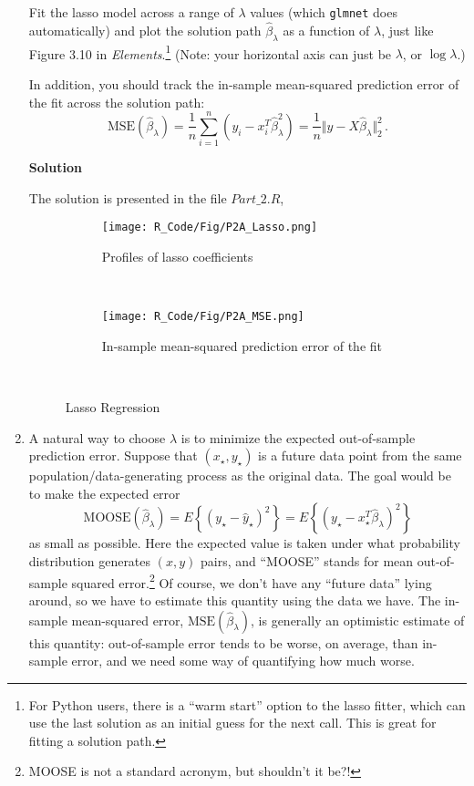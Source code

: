 \documentclass[11 pt]{article}
\begin{document}
\begin{enumerate}[label=(\Alph*)]
Fit the lasso model across a range of $\lambda$ values (which \verb|glmnet| does automatically) and plot the solution path $\hat{\beta}_{\lambda}$ as a function of $\lambda$, just like Figure 3.10 in \textit{Elements}.\footnote{For Python users, there is a ``warm start'' option to the lasso fitter, which can use the last solution as an initial guess for the next call.  This is great for fitting a solution path.}  (Note: your horizontal axis can just be $\lambda$, or $\log \lambda$.)

In addition, you should track the in-sample mean-squared prediction error of the fit across the solution path:
$$
\mathrm{MSE}(\hat \beta_{\lambda}) = \frac{1}{n} \sum_{i=1}^n (y_i - x_i^T \hat \beta_{\lambda}^2) = \frac{1}{n} \Vert y - X \hat \beta_{\lambda} \Vert_2^2 \, .
$$

\newpage
\textbf{Solution}

The solution is presented in the file $Part\_2.R$,


\begin{figure}[H]
\begin{center}
	\begin{subfigure}[h]{0.7\linewidth}
		\texttt{[image: R\_Code/Fig/P2A\_Lasso.png]}
		\caption{Profiles of lasso coefficients}
	\end{subfigure}\\
	\begin{subfigure}[h]{0.7\linewidth}
		\texttt{[image: R\_Code/Fig/P2A\_MSE.png]}
		\caption{In-sample mean-squared prediction error of the fit }
	\end{subfigure}\\
	\caption{ Lasso Regression}
	\label{fig:Fig1}
\end{center}
\end{figure}



\newpage
\item A natural way to choose $\lambda$ is to minimize the expected out-of-sample prediction error.  Suppose that $(x_{\star}, y_{\star})$ is a future data point from the same population/data-generating process as the original data.  The goal would be to make the expected error
$$
\mathrm{MOOSE}(\hat{\beta}_{\lambda}) =  E \left\{ (y_{\star} - \hat{y}_{\star} )^2 \right\} = E \left\{ (y_{\star} - x_\star^T \hat{\beta}_{\lambda} )^2 \right\} 
$$
as small as possible.  Here the expected value is taken under what probability distribution generates $(x,y)$ pairs, and ``MOOSE'' stands for mean out-of-sample squared error.\footnote{MOOSE is not a standard acronym, but shouldn't it be?!}  Of course, we don't have any ``future data'' lying around, so we have to estimate this quantity using the data we have.  The in-sample mean-squared error, $\mathrm{MSE}(\hat \beta_{\lambda})$, is generally an optimistic estimate of this quantity: out-of-sample error tends to be worse, on average, than in-sample error, and we need some way of quantifying how much worse.


\end{enumerate}
\end{document}
